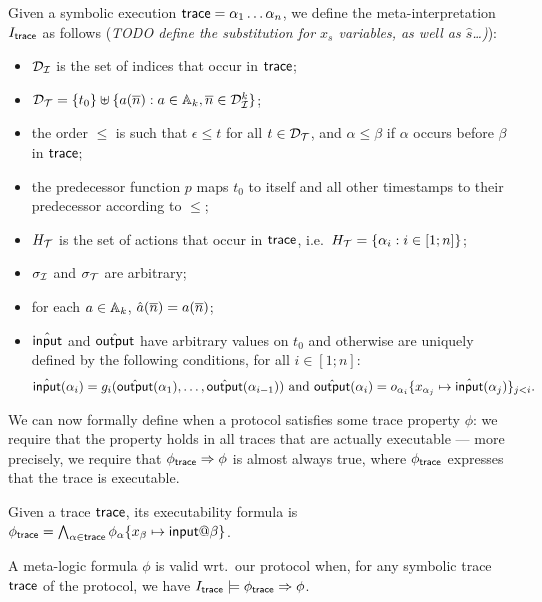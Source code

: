 \begin{definition}
  Given a symbolic execution $\textsf{trace} = \alpha_1\ldots\alpha_n$,
  we define the meta-interpretation $I_{\textsf{trace}}$ as follows
  (\emph{TODO define the substitution for $x_s$ variables,
  as well as $\hat{s}$\ldots)}):
  \begin{itemize}
    \item $\mathcal{D}_{\mathcal{I}}$ is the set of indices that occur in $\textsf{trace}$;
    \item $\mathcal{D}_{\mathcal{T}} = \{ t_0 \} \uplus \{ a(\overline{n}) : a\in\mathbb{A}_k, 
      \overline{n}\in\mathcal{D}_{\mathcal{I}}^k \}$;
    \item the order $\leq$ is such that $\epsilon\leq t$ for all $t\in\mathcal{D}_{\mathcal{T}}$,
      and $\alpha\leq\beta$ if $\alpha$ occurs before $\beta$ in $\textsf{trace}$;
    \item the predecessor function $p$ maps $t_0$ to itself and all
      other timestamps to their predecessor according to $\leq$;
    \item $H_{\mathcal{T}}$ is the set of actions that occur in $\textsf{trace}$,
      i.e.\ $H_{\mathcal{T}}=\{\alpha_i : i\in[1;n]\}$;
    \item $\sigma_{\mathcal{I}}$ and $\sigma_{\mathcal{T}}$ are arbitrary;
    \item for each $a\in\mathbb{A}_k$, $\hat{a}(\overline{n}) = a(\overline{n})$;
    \item $\hat{\textsf{input}}$ and $\hat{\textsf{output}}$ have arbitrary values on
      $t_0$ and otherwise are uniquely defined by the following
      conditions, for all $i\in[1;n]$:
      $$\hat{\textsf{input}}(\alpha_i) = 
      g_{i}(\hat{\textsf{output}}(\alpha_1),\ldots,\hat{\textsf{output}}(\alpha_{i-1}))
      \text{ and }
      \hat{\textsf{output}}(\alpha_i) =
      o_{\alpha_i}\{x_{\alpha_j}\mapsto\hat{\textsf{input}}(\alpha_j)\}_{j<i}.$$
  \end{itemize}
\end{definition}

We can now formally define when a protocol satisfies some trace property 
$\phi$:
we require that the property holds in all traces that are actually executable
--- more precisely, we require that $\phi_{\textsf{trace}} \Rightarrow \phi$ is almost
always true, where $\phi_{\textsf{trace}}$ expresses that the trace is executable.

\begin{definition}
  Given a trace $\textsf{trace}$, its executability formula
  is $\phi_\tr = \bigwedge_{\alpha\in\tr} 
  \phi_\alpha\{x_\beta\mapsto\minp@\beta\}$.
\end{definition}

\begin{definition}
  A meta-logic formula $\phi$ is valid wrt.\ our protocol when,
  for any symbolic trace $\textsf{trace}$ of the protocol,
  we have $I_{\textsf{trace}} \models \phi_{\textsf{trace}} \Rightarrow \phi$.
\end{definition}

